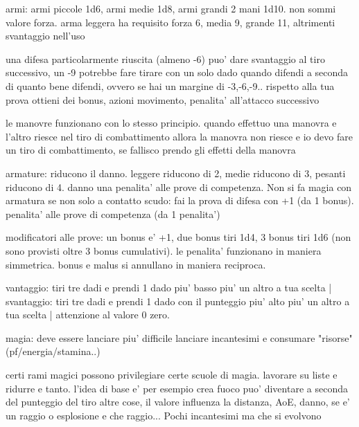 \documentclass[12pt,a4paper,twoside,openany,twocolumn]{book}
\begin{document}
armi: armi piccole 1d6, armi medie 1d8, armi grandi 2 mani 1d10. non sommi valore forza. arma leggera ha requisito forza 6, media 9, grande 11, altrimenti svantaggio nell'uso

una difesa particolarmente riuscita (almeno -6) puo' dare svantaggio al tiro successivo, un -9 potrebbe fare tirare con un solo dado
quando difendi  a seconda di quanto bene difendi, ovvero se hai un margine di -3,-6,-9.. rispetto alla tua prova ottieni dei bonus, azioni movimento, penalita' all'attacco successivo

le manovre funzionano con lo stesso principio. quando effettuo una manovra e l'altro riesce nel tiro di combattimento allora la manovra non riesce e io devo fare un tiro di combattimento, se fallisco prendo gli effetti della manovra

armature: riducono il danno. leggere riducono di 2, medie riducono di 3, pesanti riducono di 4. danno una penalita' alle prove di competenza. Non si fa magia con armatura se non solo a contatto
scudo: fai la prova di difesa con +1 (da 1 bonus). penalita' alle prove di competenza (da 1 penalita')

modificatori alle prove: un bonus e' +1, due bonus tiri 1d4, 3 bonus tiri 1d6 (non sono provisti oltre 3 bonus cumulativi). le penalita' funzionano in maniera simmetrica. bonus e malus si annullano in maniera reciproca.

vantaggio: tiri tre dadi e prendi 1 dado piu' basso piu' un altro a tua scelta   |  svantaggio: tiri tre dadi e prendi 1 dado con il punteggio piu' alto piu' un altro a tua scelta | attenzione al valore 0 zero.

magia: deve essere lanciare piu' difficile lanciare incantesimi e consumare "risorse" (pf/energia/stamina..)

certi rami magici possono privilegiare certe scuole di magia. lavorare su liste e ridurre e tanto. l'idea di base e' per esempio crea fuoco puo' diventare a seconda del punteggio del tiro altre cose, il valore influenza la distanza, AoE, danno, se e' un raggio o esplosione e che raggio...  Pochi incantesimi ma che si evolvono
\end{document}
